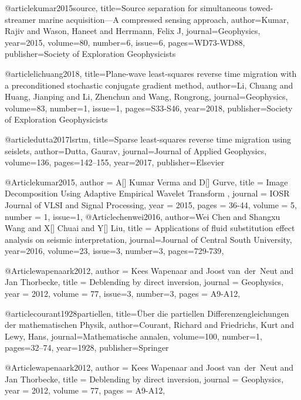 @article{kumar2015source,
  title={Source separation for simultaneous towed-streamer marine acquisition—A compressed sensing approach},
  author={Kumar, Rajiv and Wason, Haneet and Herrmann, Felix J},
  journal={Geophysics},
  year={2015},
  volume=80,
  number=6,
  issue=6,
  pages={WD73-WD88},
  publisher={Society of Exploration Geophysicists}
}

@article{lichuang2018,
  title={Plane-wave least-squares reverse time migration with a preconditioned stochastic conjugate gradient method},
  author={Li, Chuang and Huang, Jianping and Li, Zhenchun and Wang, Rongrong},
  journal={Geophysics},
  volume={83},
  number={1},
  issue=1,
  pages={S33-S46},
  year={2018},
  publisher={Society of Exploration Geophysicists}
}


@article{dutta2017lsrtm,
  title={Sparse least-squares reverse time migration using seislets},
  author={Dutta, Gaurav},
  journal={Journal of Applied Geophysics},
  volume={136},
  pages={142--155},
  year={2017},
  publisher={Elsevier}
}


@Article{kumar2015,
  author = 	 {A[] Kumar Verma and D[] Gurve},
  title = 	 {Image Decomposition Using Adaptive Empirical Wavelet Transform  
},
  journal = 	 {IOSR Journal of VLSI and Signal Processing},
  year = 	 2015,
  pages =	 {36-44},
  volume =    {5},
  number =    {1},
  issue=1,
}
@Article{chenwei2016,
  author={Wei Chen and Shangxu Wang and X[] Chuai and Y[] Liu},
  title = {Applications of fluid substitution effect analysis on seismic interpretation},
  journal={Journal of Central South University},
  year=2016,
  volume=23,
  issue=3,
  number=3,
  pages={729-739},
}

@Article{wapenaark2012,
  author = 	 {Kees Wapenaar and Joost van~der~Neut and Jan Thorbecke},
  title = 	 {Deblending by direct inversion},
  journal = 	 {Geophysics},
  year = 	 2012,
  volume =	 77,
  issue=3,
  number=3,
  pages =	 {A9-A12},
}

@article{courant1928partiellen,
  title={{\"U}ber die partiellen Differenzengleichungen der mathematischen Physik},
  author={Courant, Richard and Friedrichs, Kurt and Lewy, Hans},
  journal={Mathematische annalen},
  volume={100},
  number={1},
  pages={32--74},
  year={1928},
  publisher={Springer}
}

@Article{wapenaark2012,
  author = 	 {Kees Wapenaar and Joost van~der~Neut and Jan Thorbecke},
  title = 	 {Deblending by direct inversion},
  journal = 	 {Geophysics},
  year = 	 2012,
  volume =	 77,
  pages =	 {A9-A12},
}

